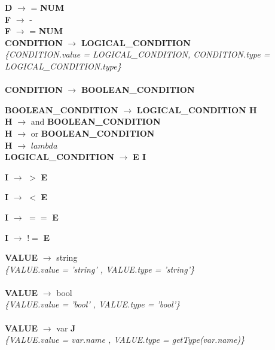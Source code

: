 \documentclass[10pt,a4paper]{article}
\begin{document}
\textbf{D} $\rightarrow$ = \textbf{NUM} \\

\textbf{F} $\rightarrow$ - \\

\textbf{F} $\rightarrow$ = \textbf{NUM} \\


\textbf{CONDITION} $\rightarrow$ \textbf{LOGICAL\_CONDITION}   \\
\textit{\{CONDITION.value = LOGICAL\_CONDITION,  CONDITION.type = LOGICAL\_CONDITION.type\}} \\ \\

\textbf{CONDITION} $\rightarrow$ \textbf{BOOLEAN\_CONDITION}

\textbf{BOOLEAN\_CONDITION} $\rightarrow$ \textbf{LOGICAL\_CONDITION H} \\

\textbf{H} $\rightarrow$ and \textbf{BOOLEAN\_CONDITION} \\

\textbf{H} $\rightarrow$ or \textbf{BOOLEAN\_CONDITION} \\

\textbf{H} $\rightarrow$ $lambda$ \\

\textbf{LOGICAL\_CONDITION} $\rightarrow$ \textbf{E I}

\textbf{I} $\rightarrow$ $>$ \textbf{E}

\textbf{I} $\rightarrow$ $<$ \textbf{E}

\textbf{I} $\rightarrow$ $==$ \textbf{E}

\textbf{I} $\rightarrow$ $!=$ \textbf{E}


\textbf{VALUE} $\rightarrow$ string \\

\textit{\{VALUE.value =  'string' , VALUE.type = 'string'\}}  \\ \\


\textbf{VALUE} $\rightarrow$ bool   \\

\textit{\{VALUE.value =  'bool' , VALUE.type = 'bool'\}}  \\ \\


\textbf{VALUE} $\rightarrow$ var \textbf{J} \\

\textit{\{VALUE.value =  var.name , VALUE.type = getType(var.name)\}}  \\ \\
\end{document}
